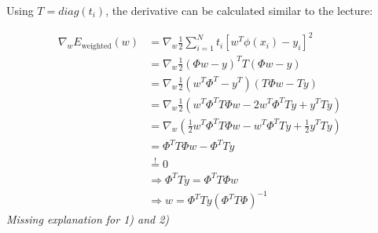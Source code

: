 

\newcommand{\ExerciseNumber}{04}

\newcommand{\PersonOne}{Marcel Bruckner (03674122)}
\newcommand{\PersonTwo}{Julian Hohenadel (03673879)}
\newcommand{\PersonThree}{Kevin Bein (03707775)}





%
%
%
\begin{flushleft}
Using $T = diag(t_i)$, the derivative can be calculated similar to the lecture:
\end{flushleft}
\begin{align*}
  \nabla_w E_\text{weighted}(w) &= \nabla_w \frac{1}{2} \sum_{i=1}^N t_i [w^T \phi(x_i) - y_i]^2 \\
  &= \nabla_w \frac{1}{2} (\Phi w - y)^T T (\Phi w - y) \\
  &= \nabla_w \frac{1}{2} (w^T \Phi^T - y^T)(T\Phi w - T y) \\
  &= \nabla_w \frac{1}{2} (w^T \Phi^T T \Phi w - 2w^T \Phi^T T y + y^T T y) \\
  &= \nabla_w (\frac{1}{2} w^T \Phi^T T \Phi w - w^T \Phi^T T y + \frac{1}{2}y^T T y) \\
  &= \Phi^T T \Phi w - \Phi^T T y \\
  &\overset{!}{=} 0
  & \\
  &\Rightarrow \Phi^T T y = \Phi^T T \Phi w \\
  &\Rightarrow w = \Phi^T T y (\Phi^T T \Phi)^{-1} 
\end{align*}
%
\textit{Missing explanation for 1) and 2)}
%
%
%
%
%
%
%
%
%
%
%
%
%
%

%



